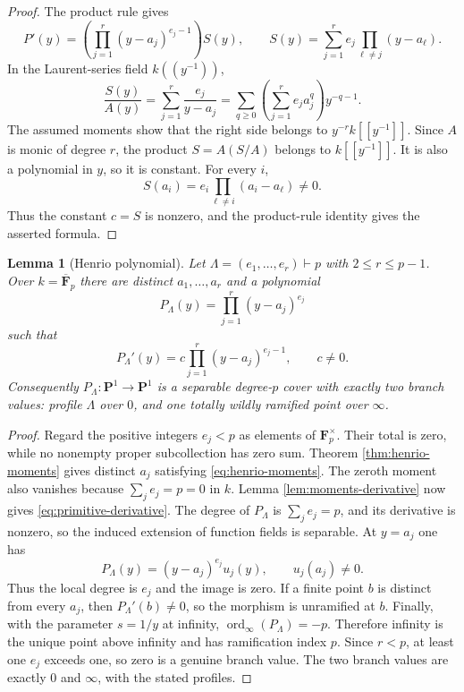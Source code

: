 \documentclass[11pt]{amsart}
\theoremstyle{plain}
\newtheorem{lemma}[theorem]{Lemma}
\theoremstyle{definition}
\newcommand{\Fp}{\overline{\mathbf F}_{p}}
\newcommand{\PP}{\mathbf P}
\numberwithin{equation}{section}
\begin{document}
\begin{proof}
The product rule gives
\[
 P'(y)=
 \left(\prod_{j=1}^r(y-a_j)^{e_j-1}\right)S(y),
 \qquad
 S(y)=\sum_{j=1}^r e_j\prod_{\ell\ne j}(y-a_\ell).
\]
In the Laurent-series field $k((y^{-1}))$,
\[
 \frac{S(y)}{A(y)}
 =\sum_{j=1}^r\frac{e_j}{y-a_j}
 =\sum_{q\geq0}
   \left(\sum_{j=1}^r e_ja_j^q\right)y^{-q-1}.
\]
The assumed moments show that the right side belongs to
$y^{-r}k[[y^{-1}]]$.  Since $A$ is monic of degree $r$, the product
$S=A(S/A)$ belongs to $k[[y^{-1}]]$.  It is also a polynomial in $y$, so
it is constant.  For every $i$,
\[
 S(a_i)=e_i\prod_{\ell\ne i}(a_i-a_\ell)\ne0.
\]
Thus the constant $c=S$ is nonzero, and the product-rule identity gives the
asserted formula.
\end{proof}

\begin{lemma}[Henrio polynomial]\label{lem:primitive}
Let $\Lambda=(e_1,\ldots,e_r)\vdash p$ with $2\leq r\leq p-1$.
Over $k=\Fp$ there are distinct $a_1,\ldots,a_r$ and a polynomial
\[
 P_\Lambda(y)=\prod_{j=1}^r(y-a_j)^{e_j}
\]
such that
\[
 P_\Lambda'(y)=c\prod_{j=1}^r(y-a_j)^{e_j-1},\qquad c\neq0.
 \label{eq:primitive-derivative}
\]
Consequently $P_\Lambda:\PP^1\to\PP^1$ is a separable degree-$p$
cover with exactly two branch values: profile $\Lambda$ over $0$, and one
totally wildly ramified point over $\infty$.
\end{lemma}

\begin{proof}
Regard the positive integers $e_j<p$ as elements of $\mathbf F_p^\times$.
Their total is zero, while no nonempty proper subcollection has zero sum.
Theorem \ref{thm:henrio-moments} gives distinct $a_j$ satisfying
\eqref{eq:henrio-moments}.
The zeroth moment also vanishes because $\sum_j e_j=p=0$ in $k$.  Lemma
\ref{lem:moments-derivative} now gives
\eqref{eq:primitive-derivative}.  The degree of $P_\Lambda$ is
$\sum_j e_j=p$, and its derivative is nonzero, so the induced extension of
function fields is separable.  At $y=a_j$ one has
\[
 P_\Lambda(y)=(y-a_j)^{e_j}u_j(y),\qquad u_j(a_j)\ne0.
\]
Thus the local degree is $e_j$ and the image is zero.  If a finite point
$b$ is distinct from every $a_j$, then
$P_\Lambda'(b)\ne0$, so the morphism is unramified at $b$.  Finally, with
the parameter $s=1/y$ at infinity,
$\operatorname{ord}_\infty(P_\Lambda)=-p$.  Therefore infinity is the
unique point above infinity and has ramification index $p$.  Since
$r<p$, at least one $e_j$ exceeds one, so zero is a genuine branch value.
The two branch values are exactly $0$ and $\infty$, with the stated
profiles.
\end{proof}
\end{document}
